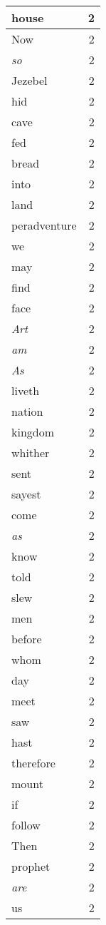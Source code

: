 \begin{center}
\begin{longtable}{l|r}
house & 2\\ \hline 
Now & 2\\ \hline 
\emph{so} & 2\\ \hline 
Jezebel & 2\\ \hline 
hid & 2\\ \hline 
cave & 2\\ \hline 
fed & 2\\ \hline 
bread & 2\\ \hline 
into & 2\\ \hline 
land & 2\\ \hline 
peradventure & 2\\ \hline 
we & 2\\ \hline 
may & 2\\ \hline 
find & 2\\ \hline 
face & 2\\ \hline 
\emph{Art} & 2\\ \hline 
\emph{am} & 2\\ \hline 
\emph{As} & 2\\ \hline 
liveth & 2\\ \hline 
nation & 2\\ \hline 
kingdom & 2\\ \hline 
whither & 2\\ \hline 
sent & 2\\ \hline 
sayest & 2\\ \hline 
come & 2\\ \hline 
\emph{as} & 2\\ \hline 
know & 2\\ \hline 
told & 2\\ \hline 
slew & 2\\ \hline 
men & 2\\ \hline 
before & 2\\ \hline 
whom & 2\\ \hline 
day & 2\\ \hline 
meet & 2\\ \hline 
saw & 2\\ \hline 
hast & 2\\ \hline 
therefore & 2\\ \hline 
mount & 2\\ \hline 
if & 2\\ \hline 
follow & 2\\ \hline 
Then & 2\\ \hline 
prophet & 2\\ \hline 
\emph{are} & 2\\ \hline 
us & 2\\ \hline 

\end{longtable}
\end{center}
